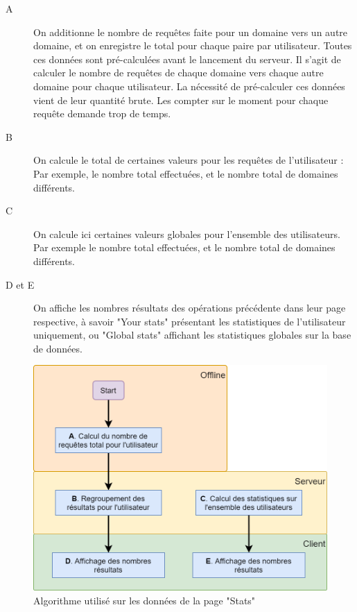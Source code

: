 		\begin{description}
			\item[A] On additionne le nombre de requêtes faite pour un domaine vers un autre domaine, et on enregistre le total pour chaque paire par utilisateur. Toutes ces données sont pré-calculées avant le lancement du serveur. Il s'agit de calculer le nombre de requêtes de chaque domaine vers chaque autre domaine pour chaque utilisateur. La nécessité de pré-calculer ces données vient de leur quantité brute. Les compter sur le moment pour chaque requête demande trop de temps.

			\item[B] On calcule le total de certaines valeurs pour les requêtes de l'utilisateur : Par exemple, le nombre total effectuées, et le nombre total de domaines différents.

			\item[C] On calcule ici certaines valeurs globales pour l'ensemble des utilisateurs. Par exemple le nombre total effectuées, et le nombre total de domaines différents.

			\item[D et E] On affiche les nombres résultats des opérations précédente dans leur page respective, à savoir "Your stats" présentant les statistiques de l'utilisateur uniquement, ou "Global stats" affichant les statistiques globales sur la base de données.

		\end{description}

		\begin{figure}[!h]
			\centering
			\includegraphics[height=0.6\textwidth]{images/design/pages/stats_algo}
			\caption{Algorithme utilisé sur les données de la page "Stats"}
			\label{stats_algo}
		\end{figure}

